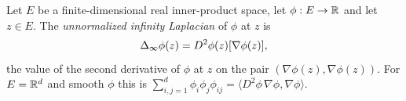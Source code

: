\begin{definition}
Let $E$ be a finite-dimensional real inner-product space, let $\phi:E\to\mathbb{R}$ and
let $z\in E$. The \emph{unnormalized infinity Laplacian} of $\phi$ at $z$ is
\[
  \Delta_{\infty}\phi(z)=D^2\phi(z)[\nabla\phi(z)],
\]
the value of the second derivative of $\phi$ at $z$ on the pair
$(\nabla\phi(z),\nabla\phi(z))$. For $E=\mathbb{R}^d$ and smooth $\phi$ this is
$\sum_{i,j=1}^d\phi_i\phi_j\phi_{ij}=\langle D^2\phi\,\nabla\phi,\nabla\phi\rangle$.
\end{definition}
